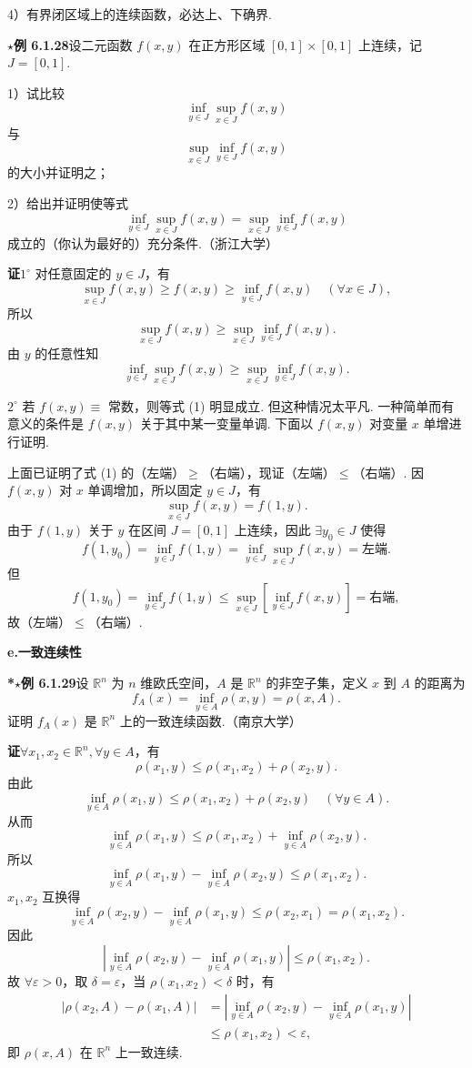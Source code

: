 \documentclass[UTF8,12pt,a4paper,fontset=fandol]{ctexart}
\begin{document}
4）有界闭区域上的连续函数，必达上、下确界.

\noindent\textbf{$\star$例 6.1.28}\quad 设二元函数 $f(x,y)$ 在正方形区域 $[0,1]\times[0,1]$ 上连续，记 $J=[0,1]$.

1）试比较
\[
  \inf_{y\in J}\sup_{x\in J}f(x,y)
\]
与
\[
  \sup_{x\in J}\inf_{y\in J}f(x,y)
\]
的大小并证明之；

2）给出并证明使等式
\[
  \inf_{y\in J}\sup_{x\in J}f(x,y)
  =\sup_{x\in J}\inf_{y\in J}f(x,y)
\tag{1}
\]
成立的（你认为最好的）充分条件.（浙江大学）

\noindent\textbf{证}\quad $1^\circ$ 对任意固定的 $y\in J$，有
\[
  \sup_{x\in J}f(x,y)\ge f(x,y)\ge \inf_{y\in J}f(x,y)
  \quad(\forall x\in J), \tag{2}
\]
所以
\[
  \sup_{x\in J}f(x,y)\ge \sup_{x\in J}\inf_{y\in J}f(x,y).
\]
由 $y$ 的任意性知
\[
  \inf_{y\in J}\sup_{x\in J}f(x,y)
  \ge \sup_{x\in J}\inf_{y\in J}f(x,y).
\]

$2^\circ$ 若 $f(x,y)\equiv$ 常数，则等式 (1) 明显成立. 但这种情况太平凡. 一种简单而有意义的条件是 $f(x,y)$ 关于其中某一变量单调. 下面以 $f(x,y)$ 对变量 $x$ 单增进行证明.

上面已证明了式 (1) 的（左端）$\ge$（右端），现证（左端）$\le$（右端）. 因 $f(x,y)$ 对 $x$ 单调增加，所以固定 $y\in J$，有
\[
  \sup_{x\in J}f(x,y)=f(1,y).
\]
由于 $f(1,y)$ 关于 $y$ 在区间 $J=[0,1]$ 上连续，因此 $\exists y_0\in J$ 使得
\[
  f(1,y_0)=\inf_{y\in J}f(1,y)
  =\inf_{y\in J}\sup_{x\in J}f(x,y)=\text{左端}.
\]
但
\[
  f(1,y_0)=\inf_{y\in J}f(1,y)
  \le \sup_{x\in J}\left[\inf_{y\in J}f(x,y)\right]
  =\text{右端},
\]
故（左端）$\le$（右端）.

\noindent\textbf{e.\quad 一致连续性}

\noindent\textbf{*$\star$例 6.1.29}\quad 设 $\mathbb{R}^n$ 为 $n$ 维欧氏空间，$A$ 是 $\mathbb{R}^n$ 的非空子集，定义 $x$ 到 $A$ 的距离为
\[
  f_A(x)=\inf_{y\in A}\rho(x,y)=\rho(x,A).
\]
证明 $f_A(x)$ 是 $\mathbb{R}^n$ 上的一致连续函数.（南京大学）

\noindent\textbf{证}\quad $\forall x_1,x_2\in\mathbb{R}^n,\forall y\in A$，有
\[
  \rho(x_1,y)\le \rho(x_1,x_2)+\rho(x_2,y).
\]
由此
\[
  \inf_{y\in A}\rho(x_1,y)\le \rho(x_1,x_2)+\rho(x_2,y)
  \quad(\forall y\in A).
\]
从而
\[
  \inf_{y\in A}\rho(x_1,y)\le \rho(x_1,x_2)+\inf_{y\in A}\rho(x_2,y).
\]
所以
\[
  \inf_{y\in A}\rho(x_1,y)-\inf_{y\in A}\rho(x_2,y)\le \rho(x_1,x_2).
\]
$x_1,x_2$ 互换得
\[
  \inf_{y\in A}\rho(x_2,y)-\inf_{y\in A}\rho(x_1,y)\le \rho(x_2,x_1)=\rho(x_1,x_2).
\]
因此
\[
  \left|\inf_{y\in A}\rho(x_2,y)-\inf_{y\in A}\rho(x_1,y)\right|\le \rho(x_1,x_2).
\]
故 $\forall\varepsilon>0$，取 $\delta=\varepsilon$，当 $\rho(x_1,x_2)<\delta$ 时，有
\[
\begin{aligned}
|\rho(x_2,A)-\rho(x_1,A)|
&=\left|\inf_{y\in A}\rho(x_2,y)-\inf_{y\in A}\rho(x_1,y)\right|\\
&\le \rho(x_1,x_2)<\varepsilon,
\end{aligned}
\]
即 $\rho(x,A)$ 在 $\mathbb{R}^n$ 上一致连续.
\end{document}
